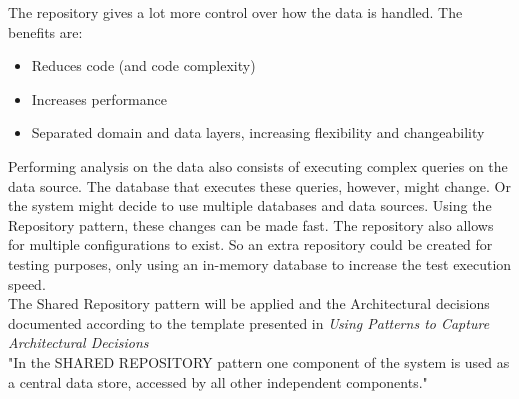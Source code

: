 The repository gives a lot more control over how the data is handled. The benefits are:
\begin{itemize}
\item Reduces code (and code complexity)
\item Increases performance
\item Separated domain and data layers, increasing flexibility and changeability
\end{itemize}

Performing analysis on the data also consists of executing complex queries on the data source. The database that executes these queries, however, might change. Or the system might decide to use multiple databases and data sources.
Using the Repository pattern, these changes can be made fast. The repository also allows for multiple configurations to exist. So an extra repository could be created for testing purposes, only using an in-memory database to increase the test execution speed. \\


The Shared Repository pattern will be applied and the Architectural decisions documented according to the template presented in \textit{Using Patterns to Capture Architectural Decisions} \\
 "In the SHARED REPOSITORY pattern one component of the system is used as a central data store, accessed by all other independent components."\\

